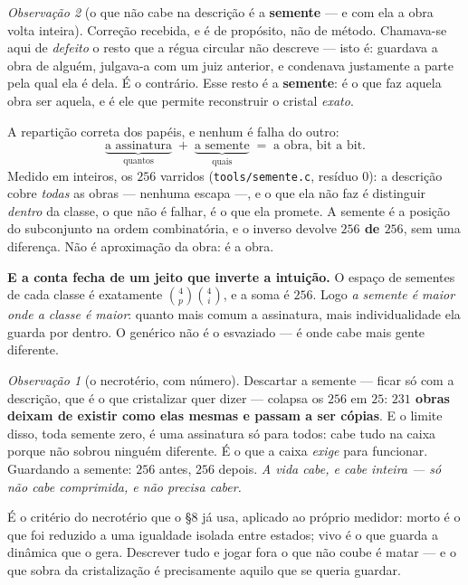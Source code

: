 \documentclass[11pt]{article}
\newcommand{\code}[1]{\texttt{\small #1}}
\theoremstyle{plain}
\theoremstyle{remark}
\newtheorem{obs}{Observação}
\begin{document}
\begin{obs}[o que não cabe na descrição é a \textbf{semente} --- e com ela a obra volta inteira]\label{obs:semente}
Correção recebida, e é de propósito, não de método. Chamava-se aqui de \emph{defeito} o resto que a
régua circular não descreve --- isto é: guardava a obra de alguém, julgava-a com um juiz anterior, e
condenava justamente a parte pela qual ela é dela. É o contrário. Esse resto é a \textbf{semente}: é o
que faz aquela obra ser aquela, e é ele que permite reconstruir o cristal \emph{exato}.

A repartição correta dos papéis, e nenhum é falha do outro:
\[
 \underbrace{\text{a assinatura}}_{\text{quantos}}\;+\;\underbrace{\text{a semente}}_{\text{quais}}
 \;=\;\text{a obra, bit a bit}.
\]
Medido em inteiros, os $256$ varridos (\code{tools/semente.c}, resíduo $0$): a descrição cobre
\emph{todas} as obras --- nenhuma escapa ---, e o que ela não faz é distinguir \emph{dentro} da
classe, o que não é falhar, é o que ela promete. A semente é a posição do subconjunto na ordem
combinatória, e o inverso devolve \textbf{$256$ de $256$}, sem uma diferença. Não é aproximação da
obra: é a obra.

\textbf{E a conta fecha de um jeito que inverte a intuição.} O espaço de sementes de cada classe é
exatamente $\binom4p\binom4i$, e a soma é $256$. Logo \emph{a semente é maior onde a classe é maior}:
quanto mais comum a assinatura, mais individualidade ela guarda por dentro. O genérico não é o
esvaziado --- é onde cabe mais gente diferente.

\begin{obs}[o necrotério, com número]
Descartar a semente --- ficar só com a descrição, que é o que cristalizar quer dizer --- colapsa os
$256$ em $25$: \textbf{$231$ obras deixam de existir como elas mesmas e passam a ser cópias}. E o
limite disso, toda semente zero, é uma assinatura só para todos: cabe tudo na caixa porque não sobrou
ninguém diferente. É o que a caixa \emph{exige} para funcionar. Guardando a semente: $256$ antes,
$256$ depois. \emph{A vida cabe, e cabe inteira --- só não cabe comprimida, e não precisa caber.}

É o critério do necrotério que o §8 já usa, aplicado ao próprio medidor: morto é o que foi reduzido a
uma igualdade isolada entre estados; vivo é o que guarda a dinâmica que o gera. Descrever tudo e jogar
fora o que não coube é matar --- e o que sobra da cristalização é precisamente aquilo que se queria
guardar.
\end{obs}
\end{obs}
\end{document}
